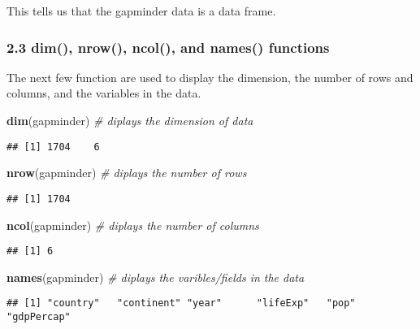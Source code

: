 \documentclass[]{article}
\newenvironment{Shaded}{\begin{snugshade}}{\end{snugshade}}
\newcommand{\KeywordTok}[1]{\textcolor[rgb]{0.13,0.29,0.53}{\textbf{{#1}}}}
\newcommand{\CommentTok}[1]{\textcolor[rgb]{0.56,0.35,0.01}{\textit{{#1}}}}
\newcommand{\NormalTok}[1]{{#1}}
\begin{document}
This tells us that the gapminder data is a data frame.

\subsubsection{\texorpdfstring{2.3 \textbf{dim(), nrow(), ncol(), and
names()}
functions}{2.3 dim(), nrow(), ncol(), and names() functions}}\label{dim-nrow-ncol-and-names-functions}

The next few function are used to display the dimension, the number of
rows and columns, and the variables in the data.

\begin{Shaded}
\begin{Highlighting}[]
\KeywordTok{dim}\NormalTok{(gapminder) }\CommentTok{#  diplays  the dimension of data}
\end{Highlighting}
\end{Shaded}

\begin{verbatim}
## [1] 1704    6
\end{verbatim}

\begin{Shaded}
\begin{Highlighting}[]
\KeywordTok{nrow}\NormalTok{(gapminder) }\CommentTok{#  diplays  the number of rows}
\end{Highlighting}
\end{Shaded}

\begin{verbatim}
## [1] 1704
\end{verbatim}

\begin{Shaded}
\begin{Highlighting}[]
\KeywordTok{ncol}\NormalTok{(gapminder) }\CommentTok{#  diplays  the number of columns}
\end{Highlighting}
\end{Shaded}

\begin{verbatim}
## [1] 6
\end{verbatim}

\begin{Shaded}
\begin{Highlighting}[]
\KeywordTok{names}\NormalTok{(gapminder) }\CommentTok{# diplays the varibles/fields in the data }
\end{Highlighting}
\end{Shaded}

\begin{verbatim}
## [1] "country"   "continent" "year"      "lifeExp"   "pop"       "gdpPercap"
\end{verbatim}
\end{document}
